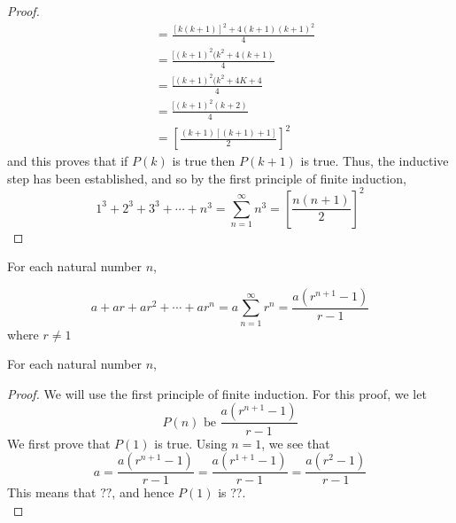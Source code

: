 \begin{example}
\begin{proof}
\begin{align*}
                    & = \frac{[k(k+1)]^2 + 4(k+1)(k+1)^2}{4} \\
                    & = \frac{[(k+1)^2(k^2 + 4(k+1)}{4} \\
                    & = \frac{[(k+1)^2(k^2 + 4K + 4}{4} \\
                    & = \frac{[(k+1)^2(k+2)}{4} \\
                    & = \left [\frac{(k+1)[(k+1) + 1]}{2} \right ]^2
            \end{align*}
        and this proves that if $P(k)$ is true then $P(k+1)$ is true. Thus, the inductive step has been established, and so by the first principle of finite induction,
            \begin{equation*}
                 1^3 + 2^3 + 3^3  + \cdots + n^3 = \sum_{n=1}^{\infty}{n^3} = \left [\frac{n(n+1)}{2} \right ]^2
            \end{equation*}
    \end{proof}
\end{example}


\newpage
\begin{example}
For each natural number $n$,
	\begin{tcolorbox}
        \begin{theorem}
                \begin{equation*}
                    a + ar + ar^2  + \cdots + ar^n = a\sum_{n=1}^{\infty}{r^n} = \frac{a(r^{n+1} - 1)}{r - 1}
                \end{equation*}
            where $r \neq 1$
        \end{theorem}
   	\end{tcolorbox} For each natural number $n$,

    \begin{proof}
        We will use the first principle of finite induction. For this proof, we let
            \begin{equation*}
                P(n) \text{ be } \frac{a(r^{n+1} - 1)}{r - 1}
            \end{equation*}
        We first prove that $P(1)$ is true. Using $n=1$, we see that
            \begin{equation*}
                a = \frac{a(r^{n+1} - 1)}{r - 1} = \frac{a(r^{1+1} - 1)}{r - 1} = \frac{a(r^2 - 1)}{r - 1}
            \end{equation*}
        This means that $??$, and hence $P(1)$ is ??. \\
        
    \end{proof}
\end{example}




